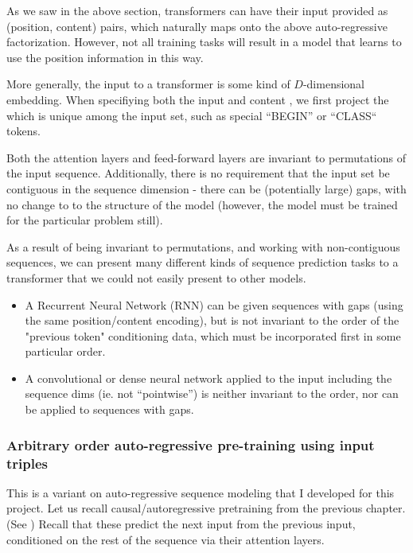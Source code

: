As we saw in the above section, transformers can have their input provided as (position, content) pairs, which naturally maps onto the above auto-regressive factorization. However, not all training tasks will result in a model that learns to use the position information in this way.

More generally, the input to a transformer is some kind of $D$-dimensional embedding. When specifiying both the input and content , we first project the which is unique among the input set, such as special ``BEGIN'' or ``CLASS`` tokens.

Both the attention layers and feed-forward layers are invariant to permutations of the input sequence. Additionally, there is no requirement that the input set be contiguous in the sequence dimension - there can be (potentially large) gaps, with no change to to the structure of the model (however, the model must be trained for the particular problem still).

As a result of being invariant to permutations, and working with non-contiguous sequences, we can present many different kinds of sequence prediction tasks to a transformer that we could not easily present to other models.

\begin{itemize}
    \item A Recurrent Neural Network (RNN) can be given sequences with gaps (using the same position/content encoding), but is not invariant to the order of the "previous token" conditioning data, which must be incorporated first in some particular order.
    \item A convolutional or dense neural network applied to the input including the sequence dims (ie. not ``pointwise'') is neither invariant to the order, nor can be applied to sequences with gaps.
\end{itemize}

\subsubsection{Arbitrary order auto-regressive pre-training using input triples}
\label{sss:pretraining-triples}

This is a variant on auto-regressive sequence modeling that I developed for this project. Let us recall causal/autoregressive pretraining from the previous chapter. (See ) Recall that these predict the next input from the previous input, conditioned on the rest of the sequence via their attention layers.


